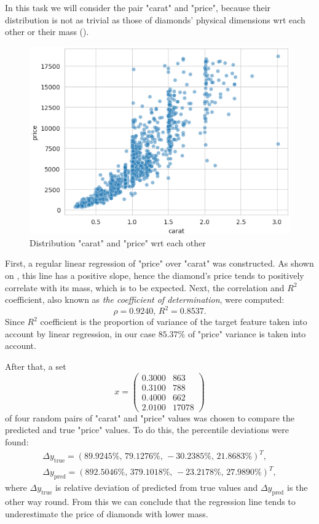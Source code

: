 \documentclass[14pt,a4paper]{extarticle}
\begin{document}
	\newpage
	
	In this task we will consider the pair "carat" and "price", because their distribution is not as trivial as those of diamonds' physical dimensions wrt each other or their mass ().
	
	\begin{figure}[hbtp]
		\centering
		\includegraphics[width=.8\textwidth]{media/caratVprice.png}
		\caption{Distribution "carat" and "price" wrt each other}
		\label{fig:caratVprice}
	\end{figure}
	
	First, a regular linear regression of "price" over "carat" was constructed. As shown on , this line has a positive slope, hence the diamond's price tends to positively correlate with its mass, which is to be expected. Next, the correlation and $R^2$ coefficient, also known as \textit{the coefficient of determination}, were computed:
	\[\rho = 0.9240,\, R^2 = 0.8537.\]
	Since $R^2$ coefficient is the proportion of variance of the target feature taken into account by linear regression, in our case  $85.37\%$ of "price" variance is taken into account.
	
	After that, a set 
	\[x=\begin{pmatrix}
			0.3000 & 863\\
			0.3100 & 788\\
			0.4000 & 662\\ 
			2.0100 & 17078
		\end{pmatrix}\]
	of four random pairs of "carat" and "price" values was chosen to compare the predicted and true "price" values. To do this, the percentile deviations were found:
	\begin{multline*}
	\Delta{}y_{\text{true}} = \left(89.9245\%,\, 79.1276\%,\, -30.2385\%,\, 21.8683\%\right)^T,\\ \Delta{}y_{\text{pred}}=\left(892.5046\%,\, 379.1018\%,\, -23.2178\%,\, 27.9890\%\right)^T,
	\end{multline*}
	where $\Delta{}y_{\text{true}}$ is relative deviation of predicted from true values and $\Delta{}y_{\text{pred}}$ is the other way round. From this we can conclude that the regression line tends to underestimate the price of diamonds with lower mass.
	
\end{document}
